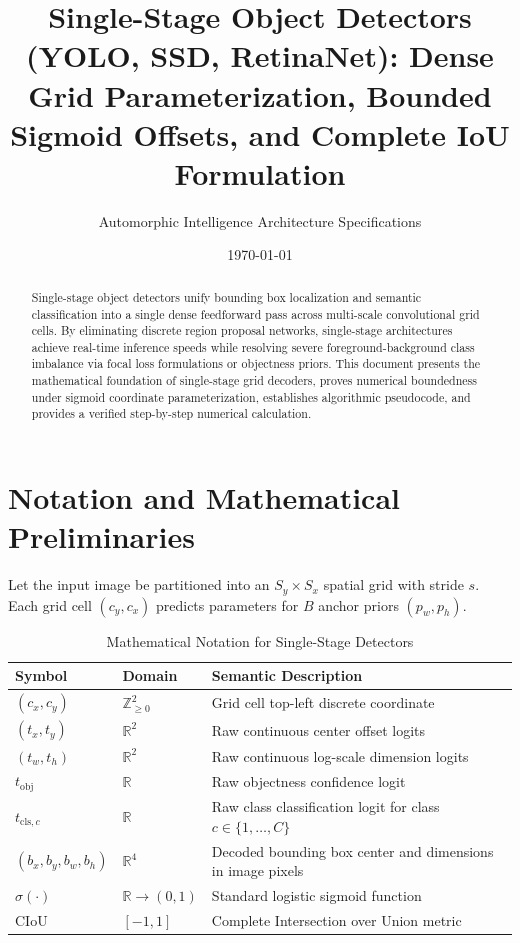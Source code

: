 \documentclass[11pt,a4paper]{article}
\title{Single-Stage Object Detectors (YOLO, SSD, RetinaNet): Dense Grid Parameterization, Bounded Sigmoid Offsets, and Complete IoU Formulation}
\author{Automorphic Intelligence Architecture Specifications}
\date{\today}
\theoremstyle{definition}
\begin{document}
\maketitle

\begin{abstract}
Single-stage object detectors unify bounding box localization and semantic classification into a single dense feedforward pass across multi-scale convolutional grid cells. By eliminating discrete region proposal networks, single-stage architectures achieve real-time inference speeds while resolving severe foreground-background class imbalance via focal loss formulations or objectness priors. This document presents the mathematical foundation of single-stage grid decoders, proves numerical boundedness under sigmoid coordinate parameterization, establishes algorithmic pseudocode, and provides a verified step-by-step numerical calculation.
\end{abstract}

\section{Notation and Mathematical Preliminaries}

Let the input image be partitioned into an $S_y \times S_x$ spatial grid with stride $s$. Each grid cell $(c_y, c_x)$ predicts parameters for $B$ anchor priors $(p_w, p_h)$.

\begin{table}[h]
\centering
\caption{Mathematical Notation for Single-Stage Detectors}
\begin{tabular}{lll}
\toprule
\textbf{Symbol} & \textbf{Domain} & \textbf{Semantic Description} \\
\midrule
$(c_x, c_y)$ & $\mathbb{Z}_{\ge 0}^2$ & Grid cell top-left discrete coordinate \\
$(t_x, t_y)$ & $\mathbb{R}^2$ & Raw continuous center offset logits \\
$(t_w, t_h)$ & $\mathbb{R}^2$ & Raw continuous log-scale dimension logits \\
$t_{\text{obj}}$ & $\mathbb{R}$ & Raw objectness confidence logit \\
$t_{\text{cls}, c}$ & $\mathbb{R}$ & Raw class classification logit for class $c \in \{1,\dots, C\}$ \\
$(b_x, b_y, b_w, b_h)$ & $\mathbb{R}^4$ & Decoded bounding box center and dimensions in image pixels \\
$\sigma(\cdot)$ & $\mathbb{R} \to (0, 1)$ & Standard logistic sigmoid function \\
$\text{CIoU}$ & $[-1, 1]$ & Complete Intersection over Union metric \\
\bottomrule
\end{tabular}
\end{table}
\end{document}

